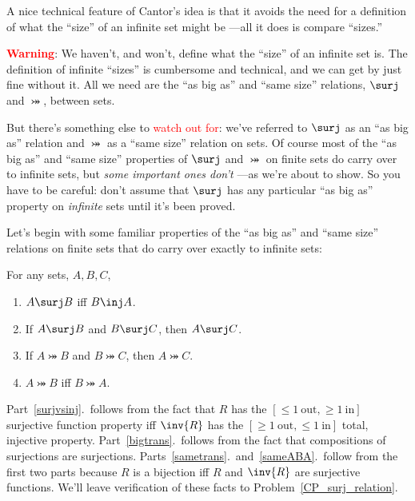 A nice technical feature of Cantor's idea is that it avoids the need
for a definition of what the ``size'' of an infinite set might be
---all it does is compare ``sizes.''

\textcolor{red}{\textbf{Warning}}: We haven't, and won't, define what
the ``size'' of an infinite set is.  The definition of infinite ``sizes''
is cumbersome and technical, and we can get by just fine without it.
All we need are the ``as big as'' and ``same size'' relations, $\surj$
and $\bij$, between sets.

But there's something else to \textcolor{red}{watch out for}: we've
referred to $\surj$ as an ``as big as'' relation and $\bij$ as a
``same size'' relation on sets.  Of course most of the ``as big as''
and ``same size'' properties of $\surj$ and $\bij$ on finite sets do
carry over to infinite sets, but \emph{some important ones don't}
---as we're about to show.  So you have to be careful: don't assume
that $\surj$ has any particular ``as big as'' property on
\emph{infinite} sets until it's been proved.

Let's begin with some familiar properties of the ``as big as'' and
``same size'' relations on finite sets that do carry over exactly to
infinite sets:
\begin{lemma}\label{surjinjbij_properties}
For any sets, $A,B,C$,
\begin{enumerate}

\item \label{surjvsinj} $A \surj B$ iff $B \inj A$.

\item \label{bigtrans} If $A \surj B$ and $B \surj C$, then $A \surj
  C$.

\item \label{sametrans} If $A \bij B$ and $B \bij C$, then $A \bij C$.

\item\label{sameABA} $A \bij B$ iff $B \bij A$.
\end{enumerate}
\end{lemma}

Part~\ref{surjvsinj}.\ follows from the fact that $R$ has the $[\le
  1\ \text{out}, \ge 1\ \text{in}]$ surjective function property iff
$\inv{R}$ has the $[\ge 1\ \text{out}, \le 1\ \text{in}]$ total,
injective property.  Part~\ref{bigtrans}.\ follows from the fact that
compositions of surjections are surjections.
Parts~\ref{sametrans}.\ and~\ref{sameABA}.\ follow from the first two
parts because $R$ is a bijection iff $R$ and $\inv{R}$ are surjective
functions.  We'll leave verification of these facts to
Problem~\ref{CP_surj_relation}.

